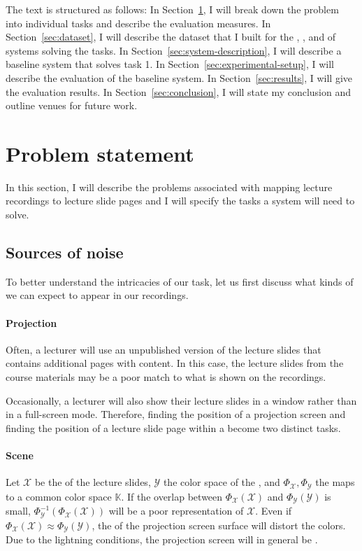 The text is structured as follows: In Section~\ref{sec:problem}, I will
break down the problem into individual tasks and describe the evaluation
measures. In Section~\ref{sec:dataset}, I will describe the dataset
that I built for the , , and
 of systems solving the tasks. In
Section~\ref{sec:system-description}, I will describe a baseline system that
solves task 1. In Section~\ref{sec:experimental-setup}, I will describe
the evaluation of the baseline system. In Section~\ref{sec:results},
I will give the evaluation results. In Section~\ref{sec:conclusion}, I will
state my conclusion and outline venues for future work.

\section{Problem statement}
\label{sec:problem}
In this section, I will describe the problems associated with mapping lecture
recordings to lecture slide pages and I will specify the tasks a system will
need to solve.

\subsection{Sources of noise}
\label{sec:noise}
To better understand the intricacies of our task, let us first discuss what
kinds of  we can expect to appear in our recordings.

\paragraph{Projection} Often, a lecturer will use an unpublished version of the
lecture slides that contains additional pages with 
content. In this case, the lecture slides from the course materials may be a
poor match to what is shown on the recordings.

Occasionally, a lecturer will also show their lecture slides in a window rather
than in a full-screen mode. Therefore, finding the position of a projection
screen and finding the position of a lecture slide page within a
 become two distinct tasks.

\paragraph{Scene} Let $\mathcal X$ be the  of the lecture
slides, $\mathcal Y$ the color space of the , and
$\Phi_{\mathcal X},\Phi_{\mathcal Y}$ the maps to a common color space
$\mathbb K$. If the overlap between $\Phi_{\mathcal X}(\mathcal X)$ and
$\Phi_{\mathcal Y}(\mathcal Y)$ is small, $\Phi^{-1}_{\mathcal
Y}(\Phi_{\mathcal X}(\mathcal X))$ will be a poor representation of $\mathcal
X$. Even if $\Phi_{\mathcal X}(\mathcal X)\approx\Phi_{\mathcal Y}(\mathcal
Y)$, the  of the projection screen surface will distort the
colors.
Due to the lightning conditions, the projection screen will in general be
.

